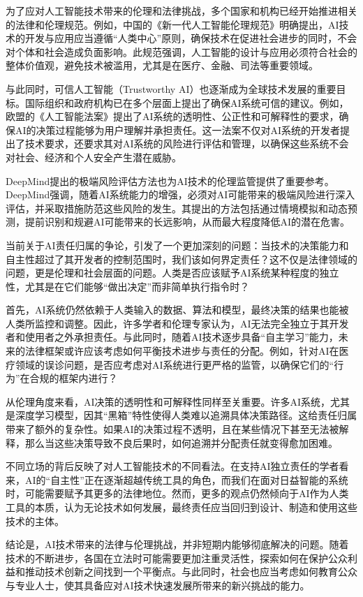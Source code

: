 为了应对人工智能技术带来的伦理和法律挑战，多个国家和机构已经开始推进相关的法律和伦理规范。例如，中国的《新一代人工智能伦理规范》明确提出，AI技术的开发与应用应当遵循“人类中心”原则，确保技术在促进社会进步的同时，不会对个体和社会造成负面影响。此规范强调，人工智能的设计与应用必须符合社会的整体价值观，避免技术被滥用，尤其是在医疗、金融、司法等重要领域。

与此同时，可信人工智能（Trustworthy AI）也逐渐成为全球技术发展的重要目标。国际组织和政府机构已在多个层面上提出了确保AI系统可信的建议。例如，欧盟的《人工智能法案》提出了AI系统的透明性、公正性和可解释性的要求，确保AI的决策过程能够为用户理解并承担责任。这一法案不仅对AI系统的开发者提出了技术要求，还要求其对AI系统的风险进行评估和管理，以确保这些系统不会对社会、经济和个人安全产生潜在威胁。

DeepMind提出的极端风险评估方法也为AI技术的伦理监管提供了重要参考。
DeepMind强调，随着AI系统能力的增强，必须对AI可能带来的极端风险进行深入评估，并采取措施防范这些风险的发生。其提出的方法包括通过情境模拟和动态预测，提前识别和规避AI可能带来的长远影响，从而最大程度降低AI的潜在危害。

当前关于AI责任归属的争论，引发了一个更加深刻的问题：当技术的决策能力和自主性超过了其开发者的控制范围时，我们该如何界定责任？这不仅是法律领域的问题，更是伦理和社会层面的问题。人类是否应该赋予AI系统某种程度的独立性，尤其是在它们能够“做出决定”而非简单执行指令时？

首先，AI系统仍然依赖于人类输入的数据、算法和模型，最终决策的结果也能被人类所监控和调整。因此，许多学者和伦理专家认为，AI无法完全独立于其开发者和使用者之外承担责任。与此同时，随着AI技术逐步具备“自主学习”能力，未来的法律框架或许应该考虑如何平衡技术进步与责任的分配。例如，针对AI在医疗领域的误诊问题，是否应考虑对AI系统进行更严格的监管，以确保它们的“行为”在合规的框架内进行？

从伦理角度来看，AI决策的透明性和可解释性同样至关重要。许多AI系统，尤其是深度学习模型，因其“黑箱”特性使得人类难以追溯具体决策路径。这给责任归属带来了额外的复杂性。如果AI的决策过程不透明，且在某些情况下甚至无法被解释，那么当这些决策导致不良后果时，如何追溯并分配责任就变得愈加困难。

不同立场的背后反映了对人工智能技术的不同看法。在支持AI独立责任的学者看来，AI的“自主性”正在逐渐超越传统工具的角色，而我们在面对日益智能的系统时，可能需要赋予其更多的法律地位。然而，更多的观点仍然倾向于AI作为人类工具的本质，认为无论技术如何发展，最终责任应当回归到设计、制造和使用这些技术的主体。

结论是，AI技术带来的法律与伦理挑战，并非短期内能够彻底解决的问题。随着技术的不断进步，各国在立法时可能需要更加注重灵活性，探索如何在保护公众利益和推动技术创新之间找到一个平衡点。与此同时，社会也应当考虑如何教育公众与专业人士，使其具备应对AI技术快速发展所带来的新兴挑战的能力。

